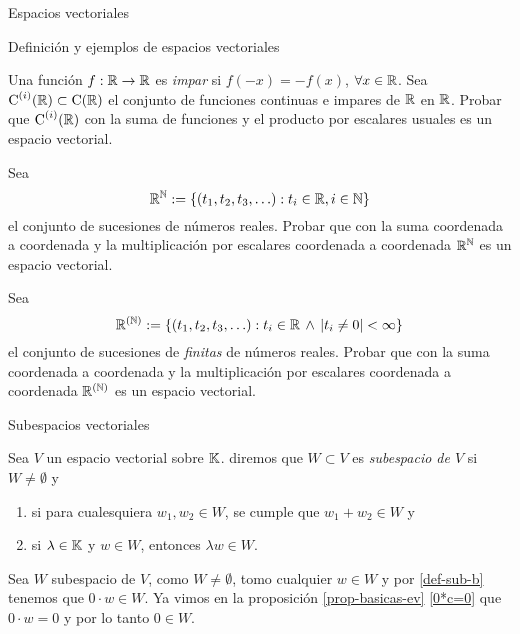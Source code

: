 \begin{chapter}{Espacios vectoriales}
\begin{section}{Definici\'on y ejemplos de espacios vectoriales}
\begin{enumex}
                \item Una función $f:\mathbb R \to \mathbb R$ es \textit{impar} si $f(-x) = -f(x)$, $\forall x \in \mathbb R$. Sea $\operatorname{C}^{(i)}(\mathbb R) \subset \operatorname{C}(\mathbb R)$  el conjunto de funciones continuas e impares de $\mathbb R$ en $\mathbb R$. Probar que  $\operatorname{C}^{(i)}(\mathbb R)$ con la suma de funciones y el producto por escalares usuales es un espacio vectorial. 
                \item\label{ejercicio-r-a-los-nat} Sea 
                $$
                \mathbb R^\mathbb N := \{(t_1,t_2,t_3, \ldots): t_i \in \mathbb R, i \in \mathbb N\}
                $$
                el conjunto de sucesiones de  números reales. Probar que con la suma coordenada a coordenada y la multiplicación por escalares coordenada a coordenada $\mathbb R^\mathbb N$ es un espacio vectorial.
                \item\label{ejercicio-r-a-los-(nat)} Sea 
                $$
                \mathbb R^{(\mathbb N)} := \{(t_1,t_2,t_3, \ldots): t_i \in \mathbb R \,\wedge \, |t_i \ne 0| <\infty\}
                $$
                el conjunto de sucesiones de \textit{finitas} de números reales. Probar que con la suma coordenada a coordenada y la multiplicación por escalares coordenada a coordenada $\mathbb R^{(\mathbb N)}$ es un espacio vectorial. 
            \end{enumex} 
   
\end{section}
    
\begin{section}{Subespacios vectoriales}\label{seccion-subespacios-vectoriales}
    \begin{definicion}
        Sea $V$ un espacio vectorial sobre $\mathbb K$. diremos que $W \subset V$ es \textit{subespacio de $V$} si $W \not= \emptyset$ y
        \begin{enumerate}[label=\textit{\alph*)},ref=\textit{\alph*)}]
            \item\label{def-sub-a} si para cualesquiera $w_1,w_2 \in W$, se cumple que $w_1+w_2 \in W$ y
            \item\label{def-sub-b} si $\lambda \in \mathbb K$ y  $w \in W$, entonces $\lambda w \in W$.
        \end{enumerate}
    \end{definicion}

    \begin{observacion} \label{obs-0-en-subespacio} Sea $W$ subespacio de $V$, como  $W \ne \emptyset$, tomo  cualquier $w \in W$ y  por \ref{def-sub-b} tenemos que $0\cdot w \in W$. Ya vimos en la proposición \ref{prop-basicas-ev} \ref{0*c=0}  que $0 \cdot w =0$ y por lo tanto $0 \in W$. 
    \end{observacion}


\end{section}
\end{chapter}
